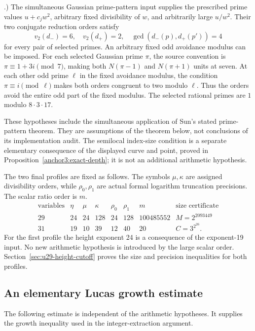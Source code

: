 \documentclass[11pt,a4paper]{article}
\theoremstyle{definition}
\theoremstyle{remark}
\begin{document}
\begin{enumerate}
      \cite[Theorem 4.1]{Sun2026Rational86}.)
      The simultaneous Gaussian prime-pattern input supplies the
      prescribed prime values $u+c_jw^2$, arbitrary fixed divisibility
      of $w$, and arbitrarily large $u/w^2$.  Their two conjugate
      reduction orders satisfy
\[
 v_2(d_-)=6,\quad v_2(d_+)=2,\quad
 \gcd(d_-(p),d_+(p'))=4
\]
      for every pair of selected primes.  An arbitrary fixed odd
      avoidance modulus can be imposed.  For each selected Gaussian
      prime $\pi$, the source convention is
      $\pi\equiv1+3i\pmod7$, making both $N(\pi-1)$ and
      $N(\pi+1)$ units at seven.  At each other odd prime $\ell$
      in the fixed avoidance modulus, the condition
      $\pi\equiv i\pmod\ell$ makes both orders congruent to two
      modulo $\ell$.  Thus the orders avoid the entire odd part
      of the fixed modulus.  The selected rational primes are $1$
      modulo $8\cdot3\cdot17$.
\end{enumerate}
These hypotheses include the simultaneous application of Sun's stated
prime-pattern theorem.  They are assumptions of the theorem below,
not conclusions of its implementation audit.
The semilocal index-size condition is a separate elementary consequence
of the displayed curve and point, proved in Proposition~\ref{anchor3:exact-depth};
it is not an additional arithmetic hypothesis.

The two final profiles are fixed as follows.  The symbols $\mu,\kappa$
are assigned divisibility orders, while $\rho_0,\rho_1$ are actual formal
logarithm truncation precisions.  The scalar ratio order is $m$.
\[
\begin{array}{c|c|cc|cc|c|c}
\text{variables}&\eta&\mu&\kappa&\rho_0&\rho_1&m&\text{size certificate}\\\hline
29&24&24&128&24&128&100485552&M=2^{2093449}\\
31&19&10&39&12&40&20&C=3^{2^{26}}.
\end{array}
\]
For the first profile the height exponent 24 is a consequence of the
exponent-19 input.  No new arithmetic hypothesis is introduced by the
large scalar order.  Section~\ref{sec:u29-height-cutoff} proves the
size and precision inequalities for both profiles.

\subsection{An elementary Lucas growth estimate}

The following estimate is independent of the arithmetic hypotheses.
It supplies the growth inequality used in the integer-extraction argument.
\end{document}

